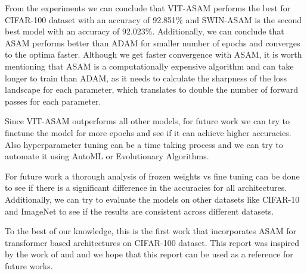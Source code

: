 \documentclass{article}
\begin{document}
From the experiments we can conclude that VIT-ASAM performs the best for CIFAR-100 dataset with an accuracy of 92.851\% and SWIN-ASAM is the second best model with an accuracy of 92.023\%.
Additionally, we can conclude that ASAM performs better than ADAM for smaller number of epochs and converges to the optima faster.
Although we get faster convergence with ASAM, it is worth mentioning that ASAM is a computationally expensive algorithm and can take longer to train than ADAM, as it needs to calculate the sharpness of the loss landscape for each parameter, which translates to double the number of forward passes for each parameter.

Since VIT-ASAM outperforms all other models, for future work we can try to finetune the model for more epochs and see if it can achieve higher accuracies.
Also hyperparameter tuning can be a time taking process and we can try to automate it using AutoML or Evolutionary Algorithms.

For future work a thorough analysis of frozen weights vs fine tuning can be done to see if there is a significant difference in the accuracies for all architectures.
Additionally, we can try to evaluate the models on other datasets like CIFAR-10 and ImageNet to see if the results are consistent across different datasets.

To the best of our knowledge, this is the first work that incorporates ASAM for transformer based architectures on CIFAR-100 dataset.
This report was inspired by the work of \cite{DBLP:journals/corr/abs-2102-11600} and \cite{DBLP:journals/corr/abs-2103-14030} and we hope that this report can be used as a reference for future works.


\nocite{*}




\end{document}
